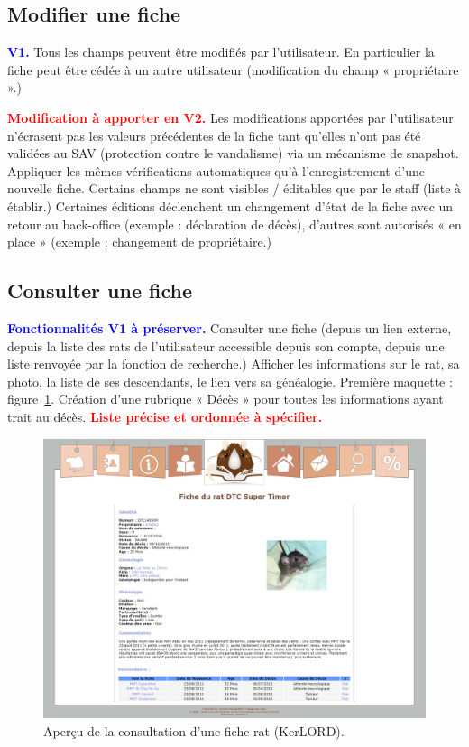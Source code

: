 \documentclass[a4paper,10pt]{article}
\newcommand\existant[1]{\noindent\textbf{\textcolor{blue}{#1}}}
\newcommand\desire[1]{\noindent\textbf{\textcolor{red}{#1}}}
\begin{document}
\subsection{Modifier une fiche}

\existant{V1.} Tous les champs peuvent être modifiés par l'utilisateur. En particulier la fiche peut être cédée à un autre utilisateur (modification du champ « propriétaire ».)  

\desire{Modification à apporter en V2.} Les modifications apportées par l'utilisateur n'écrasent pas les valeurs précédentes de la fiche tant qu'elles n'ont pas été validées au SAV (protection contre le vandalisme) via un mécanisme de snapshot. Appliquer les mêmes vérifications automatiques qu'à l'enregistrement d'une nouvelle fiche. Certains champs ne sont visibles / éditables que par le staff (liste à établir.) Certaines éditions déclenchent un changement d'état de la fiche avec un retour au back-office (exemple : déclaration de décès), d'autres sont autorisés « en place » (exemple : changement de propriétaire.)

\subsection{Consulter une fiche}
\existant{Fonctionnalités V1 à préserver.}
Consulter une fiche (depuis un lien externe, depuis la liste des rats de l'utilisateur accessible depuis son compte, depuis une liste renvoyée par la fonction de recherche.) Afficher les informations sur le rat, sa photo, la liste de ses descendants, le lien vers sa généalogie. Première maquette : figure~\ref{fig:kerfiche}. Création d'une rubrique « Décès » pour toutes les informations ayant trait au décès. \desire{Liste précise et ordonnée à spécifier.}

\begin{figure}[htbp!]
\begin{center}\includegraphics[width=0.8\linewidth]{FicheRat.jpg}\end{center}
\caption{Aperçu de la consultation d'une fiche rat (KerLORD).\label{fig:kerfiche}}
\end{figure}
\end{document}
